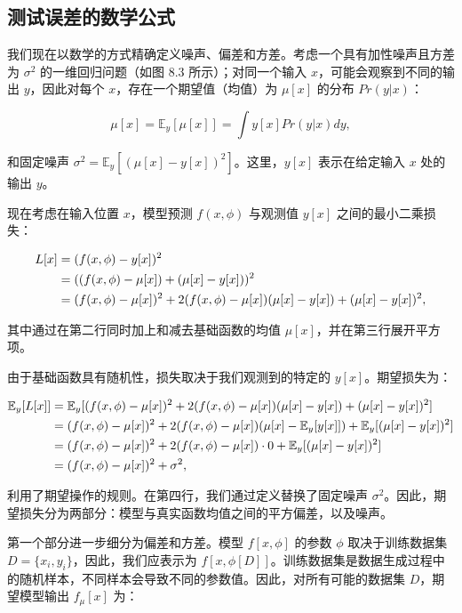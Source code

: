 \documentclass[lang=cn,newtx,10pt,scheme=chinese]{elegantbook}
\begin{document}
\subsection{测试误差的数学公式}
我们现在以数学的方式精确定义噪声、偏差和方差。考虑一个具有加性噪声且方差为 \(\sigma^2\) 的一维回归问题（如图 8.3 所示）；对同一个输入 \(x\)，可能会观察到不同的输出 \(y\)，因此对每个 \(x\)，存在一个期望值（均值）为 \(\mu[x]\) 的分布 \(Pr(y|x)\)：

\begin{equation}
\mu[x] = \mathbb{E}_y[\mu[x]] = \int y[x] Pr(y|x)dy, 
\end{equation}


和固定噪声 \(\sigma^2 = \mathbb{E}_y [(\mu[x] - y[x])^2]\)。这里，\(y[x]\) 表示在给定输入 \(x\) 处的输出 \(y\)。

现在考虑在输入位置 \(x\)，模型预测 \(f(x, \phi)\) 与观测值 \(y[x]\) 之间的最小二乘损失：


\begin{align}
L[x] &= (f(x, \phi) - y[x])^2 \notag \\
&= ((f(x, \phi) - \mu[x]) + (\mu[x] - y[x]))^2 \notag \\
&= (f(x, \phi) - \mu[x])^2 + 2(f(x, \phi) - \mu[x])(\mu[x] - y[x]) + (\mu[x] - y[x])^2, 
\end{align} 


其中通过在第二行同时加上和减去基础函数的均值 \(\mu[x]\)，并在第三行展开平方项。

由于基础函数具有随机性，损失取决于我们观测到的特定的 \(y[x]\)。期望损失为：

\begin{align}
\mathbb{E}_y[L[x]] &= \mathbb{E}_y[(f(x, \phi) - \mu[x])^2 + 2(f(x, \phi) - \mu[x])(\mu[x] - y[x]) + (\mu[x] - y[x])^2] \notag \\
&= (f(x, \phi) - \mu[x])^2 + 2(f(x, \phi) - \mu[x])(\mu[x] - \mathbb{E}_y[y[x]]) + \mathbb{E}_y[(\mu[x] - y[x])^2] \notag \\
&= (f(x, \phi) - \mu[x])^2 + 2(f(x, \phi) - \mu[x]) \cdot 0 + \mathbb{E}_y[(\mu[x] - y[x])^2] \notag \\
&= (f(x, \phi) - \mu[x])^2 + \sigma^2, 
\end{align} 


利用了期望操作的规则。在第四行，我们通过定义替换了固定噪声 \(\sigma^2\)。因此，期望损失分为两部分：模型与真实函数均值之间的平方偏差，以及噪声。

第一个部分进一步细分为偏差和方差。模型 \(f[x, \phi]\) 的参数 \(\phi\) 取决于训练数据集 \(D = \{x_i, y_i\}\)，因此，我们应表示为 \(f[x, \phi[D]]\)。训练数据集是数据生成过程中的随机样本，不同样本会导致不同的参数值。因此，对所有可能的数据集 \(D\)，期望模型输出 \(f_\mu[x]\) 为：
\end{document}
